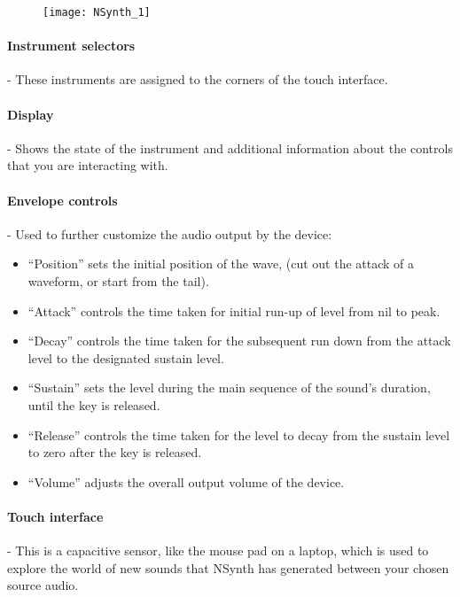 \begin{figure}[h]
\centering
\texttt{[image: NSynth\_1]}
\end{figure}

\paragraph{Instrument selectors} - These instruments are assigned to the corners of the touch interface.

\paragraph{Display} - Shows the state of the instrument and additional information about the controls that you are interacting with.

\paragraph{Envelope controls} - Used to further customize the audio output by the device:
\begin{itemize}
\item ``Position'' sets the initial position of the wave, (cut out the attack of a waveform, or start from the tail).
\item ``Attack'' controls the time taken for initial run-up of level from nil to peak.
\item ``Decay'' controls the time taken for the subsequent run down from the attack level to the designated sustain level.
\item ``Sustain'' sets the level during the main sequence of the sound's duration, until the key is released.
\item ``Release'' controls the time taken for the level to decay from the sustain level to zero after the key is released.
\item ``Volume'' adjusts the overall output volume of the device.
\end{itemize}

\paragraph{Touch interface} - This is a capacitive sensor, like the mouse pad on a laptop, which is used to explore the world of new sounds that NSynth has generated between your chosen source audio.

